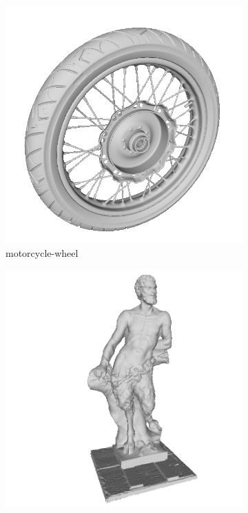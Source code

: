 \begin{figure}[!h]
	
		\begin{subfigure}[b]{0.23\linewidth}
		\includegraphics[width=\linewidth]{./Figures/train-dataset/32.motorcycle-wheel.png}
		\caption{motorcycle-wheel}
	\end{subfigure}
	\begin{subfigure}[b]{0.23\linewidth}
		\includegraphics[width=\linewidth]{./Figures/train-dataset/33.pan.png}

\end{subfigure}
\end{figure}
